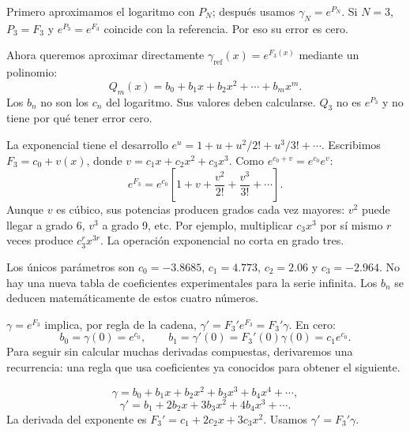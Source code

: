 Primero aproximamos el logaritmo con $P_N$; después usamos $\gamma_N=e^{P_N}$. Si $N=3$, $P_3=F_3$ y $e^{P_3}=e^{F_3}$ coincide con la referencia. Por eso su error es cero.

Ahora queremos aproximar directamente $\gamma_{\mathrm{ref}}(x)=e^{F_3(x)}$ mediante un polinomio:
\[
Q_m(x)=b_0+b_1x+b_2x^2+\cdots+b_mx^m.
\]
Los $b_n$ no son los $c_n$ del logaritmo. Sus valores deben calcularse. $Q_3$ no es $e^{P_3}$ y no tiene por qué tener error cero.

La exponencial tiene el desarrollo $e^u=1+u+u^2/2!+u^3/3!+\cdots$. Escribimos $F_3=c_0+v(x)$, donde $v=c_1x+c_2x^2+c_3x^3$. Como $e^{c_0+v}=e^{c_0}e^v$:
\[
e^{F_3}=e^{c_0}\left[1+v+\frac{v^2}{2!}+\frac{v^3}{3!}+\cdots\right].
\]
Aunque $v$ es cúbico, sus potencias producen grados cada vez mayores: $v^2$ puede llegar a grado 6, $v^3$ a grado 9, etc. Por ejemplo, multiplicar $c_3x^3$ por sí mismo $r$ veces produce $c_3^rx^{3r}$. La operación exponencial no corta en grado tres.

Los únicos parámetros son $c_0=-3.8685$, $c_1=4.773$, $c_2=2.06$ y $c_3=-2.964$. No hay una nueva tabla de coeficientes experimentales para la serie infinita. Los $b_n$ se deducen matemáticamente de estos cuatro números.

$\gamma=e^{F_3}$ implica, por regla de la cadena, $\gamma'=F_3'e^{F_3}=F_3'\gamma$. En cero:
\[
b_0=\gamma(0)=e^{c_0},\qquad b_1=\gamma'(0)=F_3'(0)\gamma(0)=c_1e^{c_0}.
\]
Para seguir sin calcular muchas derivadas compuestas, derivaremos una recurrencia: una regla que usa coeficientes ya conocidos para obtener el siguiente.

\[
\gamma=b_0+b_1x+b_2x^2+b_3x^3+b_4x^4+\cdots,
\]
\[
\gamma'=b_1+2b_2x+3b_3x^2+4b_4x^3+\cdots.
\]
La derivada del exponente es $F_3'=c_1+2c_2x+3c_3x^2$. Usamos $\gamma'=F_3'\gamma$.

